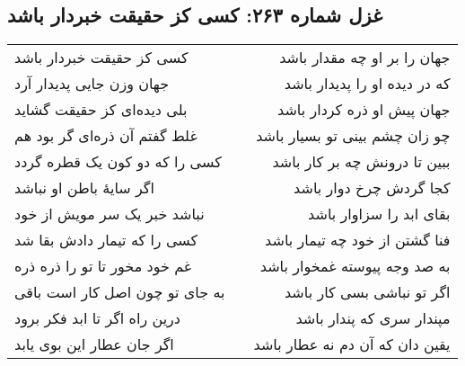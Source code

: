\begin{center}
\section*{غزل شماره ۲۶۳: کسی کز حقیقت خبردار باشد}
\label{sec:263}
\begin{longtable}{l p{0.5cm} r}
کسی کز حقیقت خبردار باشد
&&
جهان را بر او چه مقدار باشد
\\
جهان وزن جایی پدیدار آرد
&&
که در دیده او را پدیدار باشد
\\
بلی دیده‌ای کز حقیقت گشاید
&&
جهان پیش او ذره کردار باشد
\\
غلط گفتم آن ذره‌ای گر بود هم
&&
چو زان چشم بینی تو بسیار باشد
\\
کسی را که دو کون یک قطره گردد
&&
ببین تا درونش چه بر کار باشد
\\
اگر سایهٔ باطن او نباشد
&&
کجا گردش چرخ دوار باشد
\\
نباشد خبر یک سر مویش از خود
&&
بقای ابد را سزاوار باشد
\\
کسی را که تیمار دادش بقا شد
&&
فنا گشتن از خود چه تیمار باشد
\\
غم خود مخور تا تو را ذره ذره
&&
به صد وجه پیوسته غمخوار باشد
\\
به جای تو چون اصل کار است باقی
&&
اگر تو نباشی بسی کار باشد
\\
درین راه اگر تا ابد فکر برود
&&
مپندار سری که پندار باشد
\\
اگر جان عطار این بوی یابد
&&
یقین دان که آن دم نه عطار باشد
\\
\end{longtable}
\end{center}
